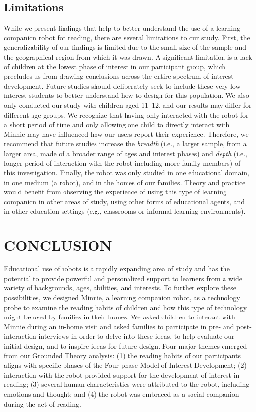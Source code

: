 \documentclass{sigchi}
\begin{document}
\subsection{Limitations}
While we present findings that help to better understand the use of a learning companion robot for reading, there are several limitations to our study. First, the generalizability of our findings is limited due to the small size of the sample and the geographical region from which it was drawn. A significant limitation is a lack of children at the lowest phase of interest in our participant group, which precludes us from drawing conclusions across the entire spectrum of interest development. Future studies should deliberately seek to include these very low interest students to better understand how to design for this population. We also only conducted our study with children aged 11--12, and our results may differ for different age groups. We recognize that having only interacted with the robot for a short period of time and only allowing one child to directly interact with Minnie may have influenced how our users report their experience. Therefore, we recommend that future studies increase the \textit{breadth} (i.e., a larger sample, from a larger area, made of a broader range of ages and interest phases) and \textit{depth} (i.e., longer period of interaction with the robot including more family members) of this investigation. Finally, the robot was only studied in one educational domain, in one medium (a robot), and in the homes of our families. Theory and practice would benefit from observing the experience of using this type of learning companion in other areas of study, using other forms of educational agents, and in other education settings (e.g., classrooms or informal learning environments).

\section{CONCLUSION}
Educational use of robots is a rapidly expanding area of study and has the potential to provide powerful and personalized support to learners from a wide variety of backgrounds, ages, abilities, and interests. To further explore these possibilities, we designed Minnie, a learning companion robot, as a technology probe to examine the reading habits of children and how this type of technology might be used by families in their homes. We asked children to interact with Minnie during an in-home visit and asked families to participate in pre- and post-interaction interviews in order to delve into these ideas, to help evaluate our initial design, and to inspire ideas for future design. Four major themes emerged from our Grounded Theory analysis: (1) the reading habits of our participants aligns with specific phases of the Four-phase Model of Interest Development; (2) interaction with the robot provided support for the development of interest in reading; (3) several human characteristics were attributed to the robot, including emotions and thought; and (4) the robot was embraced as a social companion during the act of reading.
\end{document}
